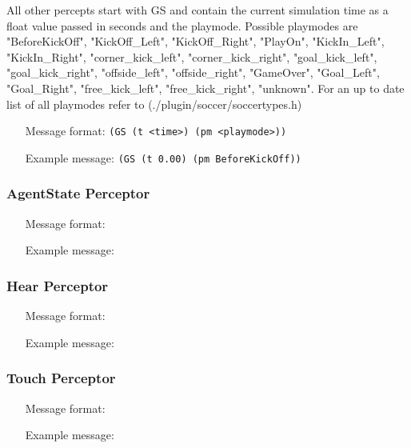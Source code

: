 All other percepts start with GS and contain the current simulation time as a
float value passed in seconds and the playmode. Possible
playmodes are "BeforeKickOff", "KickOff\_Left", "KickOff\_Right",
"PlayOn", "KickIn\_Left", "KickIn\_Right", "corner\_kick\_left",
"corner\_kick\_right", "goal\_kick\_left", "goal\_kick\_right",
"offside\_left", "offside\_right", "GameOver", "Goal\_Left",
"Goal\_Right", "free\_kick\_left", "free\_kick\_right", "unknown". For an
up to date list of all playmodes refer to (./plugin/soccer/soccertypes.h)

\begin{itemize}
	\item[Message format:] \texttt{(GS (t <time>) (pm <playmode>))}
	\item[Example message:] \texttt{(GS (t 0.00) (pm BeforeKickOff))}
\end{itemize}

\subsubsection{AgentState Perceptor}
\begin{itemize}
	\item[Message format:] \texttt{}
	\item[Example message:] \texttt{}
\end{itemize}
\subsubsection{Hear Perceptor}
\begin{itemize}
	\item[Message format:] \texttt{}
	\item[Example message:] \texttt{}
\end{itemize}
\subsubsection{Touch Perceptor}
\begin{itemize}
	\item[Message format:] \texttt{}
	\item[Example message:] \texttt{}
\end{itemize}

